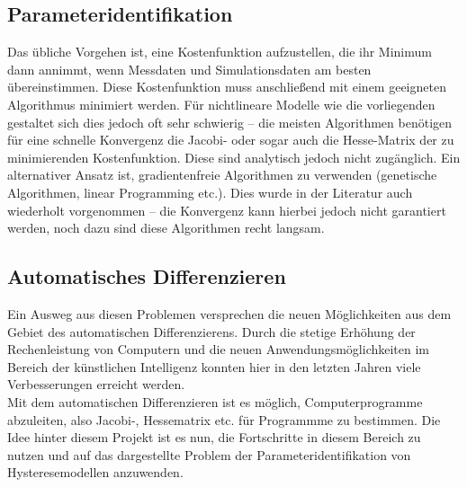 \documentclass{scrartcl}
\begin{document}
\subsection{Parameteridentifikation}
Das übliche Vorgehen ist, eine Kostenfunktion aufzustellen, die ihr Minimum dann annimmt, wenn Messdaten und Simulationsdaten am besten übereinstimmen. Diese Kostenfunktion muss anschließend mit einem geeigneten Algorithmus minimiert werden. Für nichtlineare Modelle wie die vorliegenden gestaltet sich dies jedoch oft sehr schwierig -- die meisten Algorithmen benötigen für eine schnelle Konvergenz die Jacobi- oder sogar auch die Hesse-Matrix der zu minimierenden Kostenfunktion. Diese sind analytisch jedoch nicht zugänglich. Ein alternativer Ansatz ist, gradientenfreie Algorithmen zu verwenden (genetische Algorithmen, linear Programming etc.). Dies wurde in der Literatur auch wiederholt vorgenommen -- die Konvergenz kann hierbei jedoch nicht garantiert werden, noch dazu sind diese Algorithmen recht langsam.
\subsection{Automatisches Differenzieren}
Ein Ausweg aus diesen Problemen versprechen die neuen Möglichkeiten aus dem Gebiet des automatischen Differenzierens. Durch die stetige Erhöhung der Rechenleistung von Computern und die neuen Anwendungsmöglichkeiten im Bereich der künstlichen Intelligenz konnten hier in den letzten Jahren viele Verbesserungen erreicht werden.\\
Mit dem automatischen Differenzieren ist es möglich, Computerprogramme abzuleiten, also Jacobi-, Hessematrix etc. für Programmme zu bestimmen. Die Idee hinter diesem Projekt ist es nun, die Fortschritte in diesem Bereich zu nutzen und auf das dargestellte Problem der Parameteridentifikation von Hysteresemodellen anzuwenden.
\end{document}
